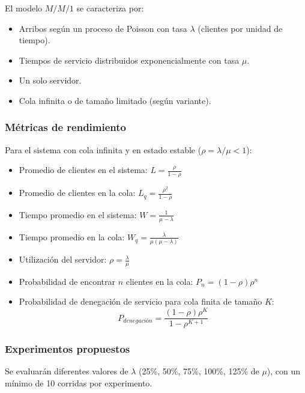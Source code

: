 \documentclass{article}
\begin{document}
El modelo \( M/M/1 \) se caracteriza por:

\begin{itemize}
    \item Arribos según un proceso de Poisson con tasa \( \lambda \) (clientes por unidad de tiempo).
    \item Tiempos de servicio distribuidos exponencialmente con tasa \( \mu \).
    \item Un solo servidor.
    \item Cola infinita o de tamaño limitado (según variante).
\end{itemize}

\subsubsection*{Métricas de rendimiento}

Para el sistema con cola infinita y en estado estable (\( \rho = \lambda / \mu < 1 \)):

\begin{itemize}
    \item Promedio de clientes en el sistema: \( L = \frac{\rho}{1 - \rho} \)
    \item Promedio de clientes en la cola: \( L_q = \frac{\rho^2}{1 - \rho} \)
    \item Tiempo promedio en el sistema: \( W = \frac{1}{\mu - \lambda} \)
    \item Tiempo promedio en la cola: \( W_q = \frac{\lambda}{\mu(\mu - \lambda)} \)
    \item Utilización del servidor: \( \rho = \frac{\lambda}{\mu} \)
    \item Probabilidad de encontrar \( n \) clientes en la cola: \( P_n = (1 - \rho)\rho^n \)
    \item Probabilidad de denegación de servicio para cola finita de tamaño \( K \):
    \[
        P_{denegación} = \frac{(1 - \rho)\rho^K}{1 - \rho^{K+1}}
    \]
\end{itemize}

\subsubsection*{Experimentos propuestos}

Se evaluarán diferentes valores de \( \lambda \) (25\%, 50\%, 75\%, 100\%, 125\% de \( \mu \)), con un mínimo de 10 corridas por experimento.
\end{document}
